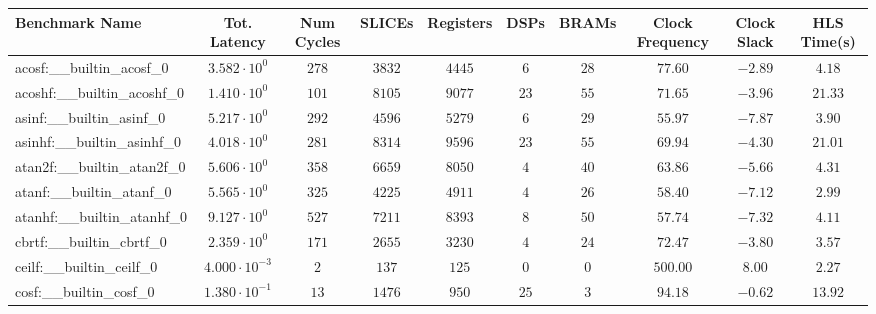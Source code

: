 \begin{tabular}{|l|c|c|c|c|c|c|c|c|c|}
\hline
Benchmark Name                            & Tot. Latency            & Num Cycles & SLICEs     & Registers  & DSPs    & BRAMs   & Clock Frequency & Clock Slack & HLS Time(s) \\
\hline
acosf:\_\_builtin\_acosf\_0               & $ 3.582 \cdot 10^{0}  $ & $ 278    $ & $ 3832   $ & $ 4445   $ & $ 6   $ & $ 28  $ & $ 77.60       $ & $ -2.89   $ & $ 4.18    $ \\
acoshf:\_\_builtin\_acoshf\_0             & $ 1.410 \cdot 10^{0}  $ & $ 101    $ & $ 8105   $ & $ 9077   $ & $ 23  $ & $ 55  $ & $ 71.65       $ & $ -3.96   $ & $ 21.33   $ \\
asinf:\_\_builtin\_asinf\_0               & $ 5.217 \cdot 10^{0}  $ & $ 292    $ & $ 4596   $ & $ 5279   $ & $ 6   $ & $ 29  $ & $ 55.97       $ & $ -7.87   $ & $ 3.90    $ \\
asinhf:\_\_builtin\_asinhf\_0             & $ 4.018 \cdot 10^{0}  $ & $ 281    $ & $ 8314   $ & $ 9596   $ & $ 23  $ & $ 55  $ & $ 69.94       $ & $ -4.30   $ & $ 21.01   $ \\
atan2f:\_\_builtin\_atan2f\_0             & $ 5.606 \cdot 10^{0}  $ & $ 358    $ & $ 6659   $ & $ 8050   $ & $ 4   $ & $ 40  $ & $ 63.86       $ & $ -5.66   $ & $ 4.31    $ \\
atanf:\_\_builtin\_atanf\_0               & $ 5.565 \cdot 10^{0}  $ & $ 325    $ & $ 4225   $ & $ 4911   $ & $ 4   $ & $ 26  $ & $ 58.40       $ & $ -7.12   $ & $ 2.99    $ \\
atanhf:\_\_builtin\_atanhf\_0             & $ 9.127 \cdot 10^{0}  $ & $ 527    $ & $ 7211   $ & $ 8393   $ & $ 8   $ & $ 50  $ & $ 57.74       $ & $ -7.32   $ & $ 4.11    $ \\
cbrtf:\_\_builtin\_cbrtf\_0               & $ 2.359 \cdot 10^{0}  $ & $ 171    $ & $ 2655   $ & $ 3230   $ & $ 4   $ & $ 24  $ & $ 72.47       $ & $ -3.80   $ & $ 3.57    $ \\
ceilf:\_\_builtin\_ceilf\_0               & $ 4.000 \cdot 10^{-3} $ & $ 2      $ & $ 137    $ & $ 125    $ & $ 0   $ & $ 0   $ & $ 500.00      $ & $ 8.00    $ & $ 2.27    $ \\
cosf:\_\_builtin\_cosf\_0                 & $ 1.380 \cdot 10^{-1} $ & $ 13     $ & $ 1476   $ & $ 950    $ & $ 25  $ & $ 3   $ & $ 94.18       $ & $ -0.62   $ & $ 13.92   $ \\

\end{tabular}
